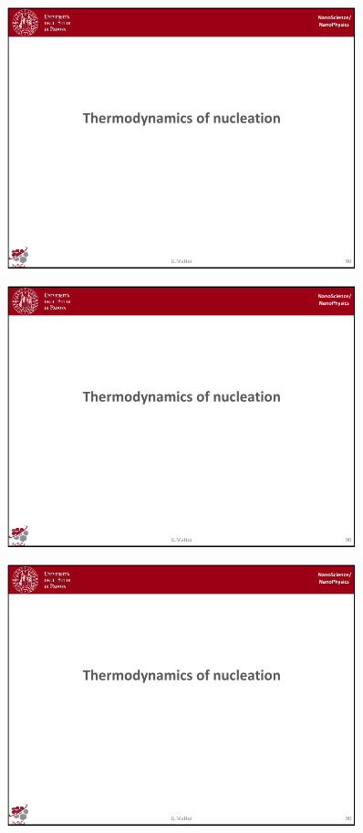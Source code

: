 \documentclass[../main/main.tex]{subfiles}
\begin{document}
\begin{figure}[h!]
\centering
\includegraphics[page=8,width=0.9\textwidth]{../lessons/pdf_file/6_lesson.pdf} 
\end{figure}
\begin{figure}[h!]
\centering
\includegraphics[page=9,width=0.9\textwidth]{../lessons/pdf_file/6_lesson.pdf} 
\end{figure}
\begin{figure}[h!]
\centering
\includegraphics[page=10,width=0.9\textwidth]{../lessons/pdf_file/6_lesson.pdf}
\end{figure}
\end{document}
